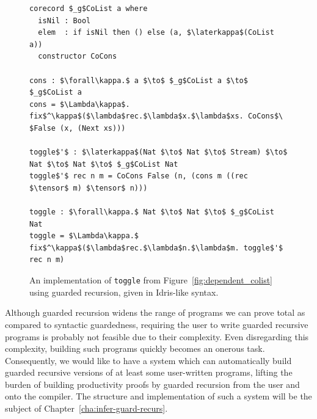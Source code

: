 \begin{figure}[h]
\begin{lstlisting}[mathescape]
corecord $_g$CoList a where
  isNil : Bool
  elem  : if isNil then () else (a, $\laterkappa$(CoList a))
  constructor CoCons

cons : $\forall\kappa.$ a $\to$ $_g$CoList a $\to$ $_g$CoList a
cons = $\Lambda\kappa$. fix$^\kappa$($\lambda$rec.$\lambda$x.$\lambda$xs. CoCons$\ $False (x, (Next xs)))

toggle$'$ : $\laterkappa$(Nat $\to$ Nat $\to$ Stream) $\to$ Nat $\to$ Nat $\to$ $_g$CoList Nat
toggle$'$ rec n m = CoCons False (n, (cons m ((rec $\tensor$ m) $\tensor$ n))) 

toggle : $\forall\kappa.$ Nat $\to$ Nat $\to$ $_g$CoList Nat
toggle = $\Lambda\kappa.$ fix$^\kappa$($\lambda$rec.$\lambda$n.$\lambda$m. toggle$'$ rec n m)
\end{lstlisting}
  \caption{An implementation of \texttt{toggle} from
    Figure~\ref{fig:dependent_colist} using guarded recursion, given in
    Idris-like syntax.}
\label{fig:toggle_guarded_recursion}
\end{figure}

Although guarded recursion widens the range of programs we can prove total as
compared to syntactic guardedness, requiring the user to write guarded recursive
programs is probably not feasible due to their complexity. Even disregarding
this complexity, building such programs quickly becomes an onerous
task. Consequently, we would like to have a system which can automatically build
guarded recursive versions of at least some user-written programs, lifting the burden of
building productivity proofs by guarded recursion from the user and onto the
compiler. The structure and implementation of such a system will be the subject
of Chapter~\ref{cha:infer-guard-recurs}.

